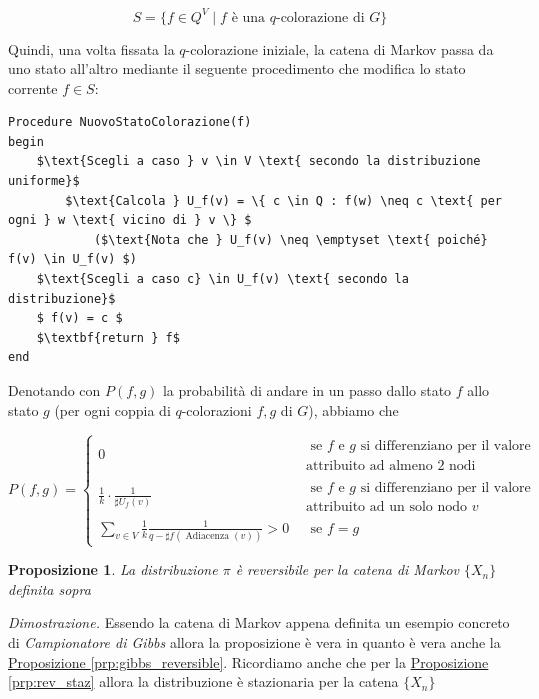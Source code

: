 \documentclass{article}
\newtheorem{proposition}{Proposizione}[section]
\begin{document}
$$S = \{ f \in Q^V \mid f \text{ è una } q\text{-colorazione di } G \}$$


Quindi, una volta fissata la $ q $-colorazione iniziale, la catena di Markov passa da uno stato all'altro mediante il seguente procedimento che modifica lo stato corrente $ f \in S $:

\begin{lstlisting}
Procedure NuovoStatoColorazione(f)
begin
    $\text{Scegli a caso } v \in V \text{ secondo la distribuzione uniforme}$
        $\text{Calcola } U_f(v) = \{ c \in Q : f(w) \neq c \text{ per ogni } w \text{ vicino di } v \} $
            ($\text{Nota che } U_f(v) \neq \emptyset \text{ poiché}  f(v) \in U_f(v) $)
    $\text{Scegli a caso c} \in U_f(v) \text{ secondo la distribuzione}$
    $ f(v) = c $
    $\textbf{return } f$
end
\end{lstlisting}

Denotando con $ P(f, g) $ la probabilità di andare in un passo dallo stato $ f $ allo stato $ g $ (per ogni coppia di $ q $-colorazioni $ f, g $ di $ G $), abbiamo che

\begin{equation*}
    P(f, g)=\left\{\begin{array}{ll}
0 & \begin{array}{c} \text { se } f \text { e } g \text { si differenziano per il valore }\\ \text{attribuito ad almeno } 2 \text { nodi } \end{array}\\
\frac{1}{k} \cdot \frac{1}{\sharp U_{f}(v)} & \begin{array}{c} \text { se } f \text { e } g \text { si differenziano per il valore }\\ \text{attribuito ad un solo nodo } v  \end{array} \\
    \sum_{v \in V} \frac{1}{k} \frac{1}{q-\sharp f(\operatorname{Adiacenza}(v))}>0 &  \begin{array}{c} \text{ se } f = g \end{array}
\end{array}\right. 
\end{equation*}

\begin{proposition}
\label{def:algebra}
La distribuzione $\pi$ è reversibile per la catena di Markov $ \{X_n\}$ definita sopra
\end{proposition}
\textit{Dimostrazione.}
Essendo la catena di Markov appena definita un esempio concreto di \textit{Campionatore di Gibbs} allora la proposizione è vera in quanto è vera anche la \hyperref[prp:gibbs_reversible]{Proposizione \ref*{prp:gibbs_reversible}}. 
Ricordiamo anche che per la \hyperref[prp:rev_staz]{Proposizione \ref*{prp:rev_staz}} allora la distribuzione è stazionaria per la catena $ \{X_n\} $
\end{document}
